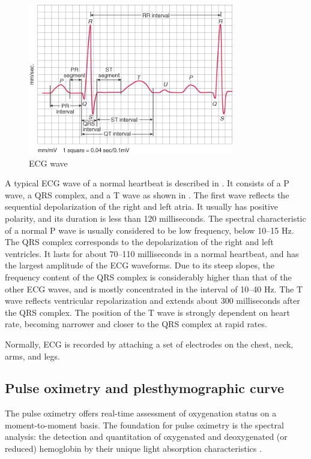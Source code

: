 \begin{figure}[!ht]
\centering
\includegraphics[width=0.8\textwidth]{images/ECGwave.png}
\caption{ECG wave}
\label{fig:ecg}
\end{figure}


A typical ECG wave of a normal heartbeat is described in  \cite{wang2008analysis}. It consists of a P wave, a QRS complex, and a T wave as shown in . The first wave reflects the sequential depolarization of the right and left atria. It usually has positive polarity, and its duration is less than 120 milliseconds. The spectral characteristic of a normal P wave is usually considered to be low frequency, below 10–15 Hz. The QRS complex corresponds to the depolarization of the right and left ventricles. It lasts for about 70–110 milliseconds in a normal heartbeat, and has the largest amplitude of the ECG waveforms. Due to its steep slopes, the frequency content of the QRS complex is considerably higher than that of the other ECG waves, and is mostly concentrated in the interval of 10–40 Hz. The T wave reflects ventricular repolarization and extends about 300 milliseconds after the QRS complex. The position of the T wave is strongly dependent on heart rate, becoming narrower and closer to the QRS complex at rapid rates.


Normally, ECG is recorded by attaching a set of electrodes on the chest, neck, arms, and legs.


\subsection{Pulse oximetry and plesthymographic curve}
\label{subsec:setup:phys-signals:ppg}


The pulse oximetry offers real-time assessment of oxygenation status on a moment-to-moment basis. The foundation for pulse oximetry is the spectral analysis: the detection and quantitation of oxygenated and deoxygenated (or reduced) hemoglobin by their unique light absorption characteristics \cite{sinex1999pulse, bagha2011real}.

